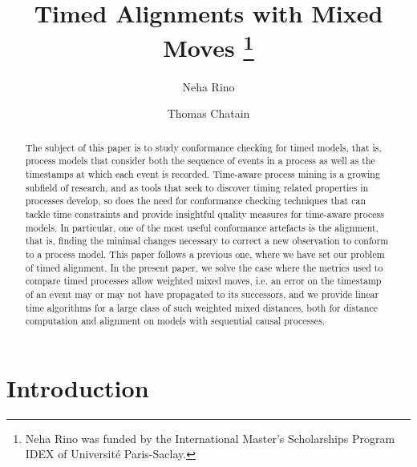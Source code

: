 \documentclass[runningheads]{llncs}
\begin{document}
%
\title{Timed Alignments with Mixed Moves
		\thanks{Neha Rino was funded by the International Master's Scholarships Program IDEX of Université Paris-Saclay.}
}%
%
\author{Neha Rino \and
Thomas Chatain}
%

%
\maketitle              %
%
\begin{abstract}
The subject of this paper is to study conformance checking for timed models, that is, process models that consider both the sequence of events in a process as well as the timestamps at which each event is recorded. 
Time-aware process mining is a growing subfield of research, and as tools that seek to discover timing related properties in processes develop, so does the need for conformance checking techniques that can tackle time 
constraints and provide insightful quality measures for time-aware process models. 
In particular, one of the most useful conformance artefacts is the alignment, that is, finding the minimal changes necessary to correct a new observation to conform to a process model.  
This paper follows a previous one, where we have set our problem of timed alignment. In the present paper, we solve the case where the metrics used to compare timed processes allow weighted mixed moves,
 i.e. an error on the timestamp of an event may or may not have propagated to its successors, and we provide linear time algorithms for a large class of such weighted mixed distances, both for distance computation and alignment on models with sequential causal processes. 

\end{abstract}
%
%
%
\section{Introduction} 
	
\end{document}
